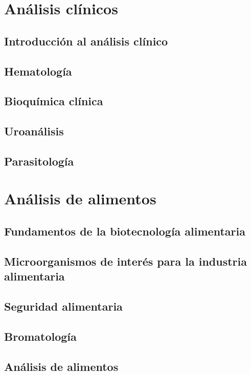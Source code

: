 \documentclass{../Resume}
\begin{document}
\Portada
\Indice
\fancystyle
\onehalfspacing


\part{Análisis clínicos}

    \chapter{Introducción al análisis clínico}
    \chapter{Hematología}
    \chapter{Bioquímica clínica}
    \chapter{Uroanálisis}
    \chapter{Parasitología}

\part{Análisis de alimentos}

    \chapter{Fundamentos de la biotecnología alimentaria}
    \chapter{Microorganismos de interés para la industria alimentaria}
    \chapter{Seguridad alimentaria}
    \chapter{Bromatología}
    \chapter{Análisis de alimentos}
\end{document}
